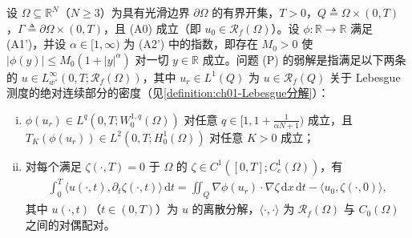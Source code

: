 \documentclass[../../main.tex]{subfiles}%
\begin{document}
\begin{definition}\label{definition:ch06-无界弱解}
设 $\Omega\subseteq\mathbb{R}^N$（$N\geqslant3$）为具有光滑边界 $\partial\Omega$ 的有界开集，$T>0$，$Q\triangleq\Omega\times(0,T)$，$\Gamma\triangleq\partial\Omega\times(0,T)$，且 (A0) 成立（即 $u_0\in\mathscr{R}_f(\Omega)$）。设 $\phi:\mathbb{R}\to\mathbb{R}$ 满足 (A1')，并设 $\alpha\in[1,\infty)$ 为 (A2') 中的指数，即存在 $M_0>0$ 使 $|\phi(y)|\leqslant M_0(1+|y|^{\alpha})$ 对一切 $y\in\mathbb{R}$ 成立。问题 (P) 的弱解是指满足以下两条的 $u\in L^\infty_{w^*}(0,T;\mathscr{R}_f(\Omega))$，其中 $u_r\in L^1(Q)$ 为 $u\in\mathscr{R}_f(Q)$ 关于 Lebesgue 测度的绝对连续部分的密度（见\cref{definition:ch01-Lebesgue分解}）：
\begin{enumerate}[(i)]
\item $\phi(u_r)\in L^q(0,T;W^{1,q}_0(\Omega))$ 对任意 $q\in[1,1+\frac{1}{\alpha N+1})$ 成立，且 $T_K(\phi(u_r))\in L^2(0,T;H^1_0(\Omega))$ 对任意 $K>0$ 成立；
\item 对每个满足 $\zeta(\cdot,T)=0$ 于 $\Omega$ 的 $\zeta\in C^1([0,T];C^1_c(\Omega))$，有
\begin{align}
\int_0^T\langle u(\cdot,t),\partial_t\zeta(\cdot,t)\rangle\,\mathrm{d}t
= \iint_Q\nabla\phi(u_r)\cdot\nabla\zeta\,\mathrm{d}x\,\mathrm{d}t
-\langle u_0,\zeta(\cdot,0)\rangle , \label{align:ch6-6.132}
\end{align}
其中 $u(\cdot,t)$（$t\in(0,T)$）为 $u$ 的离散分解，$\langle\cdot,\cdot\rangle$ 为 $\mathscr{R}_f(\Omega)$ 与 $C_0(\Omega)$ 之间的对偶配对。
\end{enumerate}
\end{definition}
\end{document}
